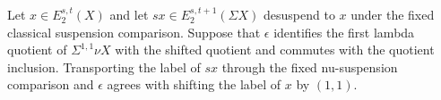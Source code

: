 \begin{theorem}
\label{frontier:AdamsSynthetic:837d666cb875}
Let $x\in E_2^{s,t}(X)$ and let $sx\in E_2^{s,t+1}(\Sigma X)$ desuspend to $x$ under the fixed classical suspension comparison. Suppose that $\epsilon$ identifies the first lambda quotient of $\Sigma^{1,1}\nu X$ with the shifted quotient and commutes with the quotient inclusion. Transporting the label of $sx$ through the fixed nu-suspension comparison and $\epsilon$ agrees with shifting the label of $x$ by $(1,1)$.
\end{theorem}

